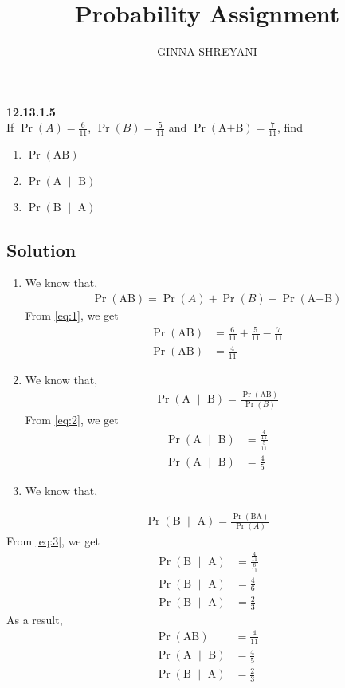 \documentclass[10pt,twocolumn]{article}
\title{
Probability Assignment
}
\author{GINNA SHREYANI}
\date{}
\providecommand{\pr}[1]{\ensuremath{\Pr\left(#1\right)}}
\begin{document}
\maketitle


\textbf{12.13.1.5}\\
If $\pr A=\frac{6}{11}$, $\pr B=\frac{5}{11}$ and $\pr{\text{A+B}}=\frac{7}{11}$, find
\begin{enumerate}
	\item $\pr{\text{AB}}$   
	\item $\pr{\text{A $\mid$ B}}$
	\item $\pr{\text{B $\mid$ A}}$
\end{enumerate}
\subsection*{Solution}
\begin{enumerate}
	\item We know that,
\begin{align}
	\pr{\text{AB}} = \pr A + \pr B -\pr{\text{A+B}}
	\label{eq:1}
\end{align}
From \eqref{eq:1}, we get
\begin{align}
	\pr{\text{AB}} &= \frac{6}{11} + \frac{5}{11} - \frac{7}{11}\\
	\pr{\text{AB}} &= \frac{4}{11}
\end{align}
	\item We know that,
\begin{align}
	\pr{\text{A $\mid$ B}} = \frac{\pr{\text{AB}}}{\pr B}
	\label{eq:2}
\end{align}
From \eqref{eq:2}, we get
\begin{align}
	\pr{\text{A $\mid$ B}} &= \frac{\frac{4}{11}}{\frac{5}{11}}\\
	\pr{\text{A $\mid$ B}} &= \frac{4}{5}
\end{align}
	\item We know that,
\end{enumerate}
\begin{align}
	\pr{\text{B $\mid$ A}}=\frac{\pr{\text{BA}}}{\pr A}
	\label{eq:3}
\end{align}
From \eqref{eq:3}, we get
\begin{align}
	\pr{\text{B $\mid$ A}} &= \frac{\frac{4}{11}}{\frac{6}{11}}\\
	\pr{\text{B $\mid$ A}} &= \frac{4}{6}\\
	\pr{\text{B $\mid$ A}} &= \frac{2}{3}
\end{align}
As a result,
\begin{align}
	\pr{\text{AB}} &= \frac{4}{11}\\
	\pr{\text{A $\mid$ B}} &= \frac{4}{5}\\
	\pr{\text{B $\mid$ A}} &= \frac{2}{3}
\end{align}
\end{document}
